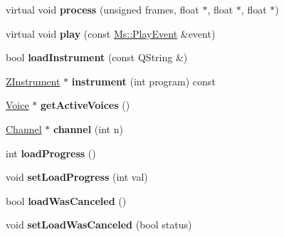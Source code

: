 \begin{DoxyCompactItemize}
\item 
\mbox{\label{class_zerberus_a9ba0f0308f39f55b6ad39cc3af3abbe5}} 
virtual void {\bfseries process} (unsigned frames, float $\ast$, float $\ast$, float $\ast$)
\item 
\mbox{\label{class_zerberus_a53c7d6ed156935e3c18e4324d8d34ee3}} 
virtual void {\bfseries play} (const \hyperlink{class_ms_1_1_play_event}{Ms\+::\+Play\+Event} \&event)
\item 
\mbox{\label{class_zerberus_a9984085d7a0cdccd4e3a6a67fc2c4167}} 
bool {\bfseries load\+Instrument} (const Q\+String \&)
\item 
\mbox{\label{class_zerberus_aba1b922e295c8f41f6be2049277d9a21}} 
\hyperlink{class_z_instrument}{Z\+Instrument} $\ast$ {\bfseries instrument} (int program) const
\item 
\mbox{\label{class_zerberus_a1ee6ff8ec33fe5164857f727c57d466f}} 
\hyperlink{class_voice}{Voice} $\ast$ {\bfseries get\+Active\+Voices} ()
\item 
\mbox{\label{class_zerberus_a706c2082216e09088e2264c559308bf1}} 
\hyperlink{class_channel}{Channel} $\ast$ {\bfseries channel} (int n)
\item 
\mbox{\label{class_zerberus_a6e8eee601466323ed82dfe60e9c64548}} 
int {\bfseries load\+Progress} ()
\item 
\mbox{\label{class_zerberus_aaef6c788b04dc83fe8f54f40f183b48a}} 
void {\bfseries set\+Load\+Progress} (int val)
\item 
\mbox{\label{class_zerberus_a87185795ff8905719a0f1fe32ebdf211}} 
bool {\bfseries load\+Was\+Canceled} ()
\item 
\mbox{\label{class_zerberus_a273ed118311fab7326b966316f63ca13}} 
void {\bfseries set\+Load\+Was\+Canceled} (bool status)
\item 
\mbox{\label{class_zerberus_aa9a4d61ebb3634718c8cc193254fa74d}} 

\end{DoxyCompactItemize}
